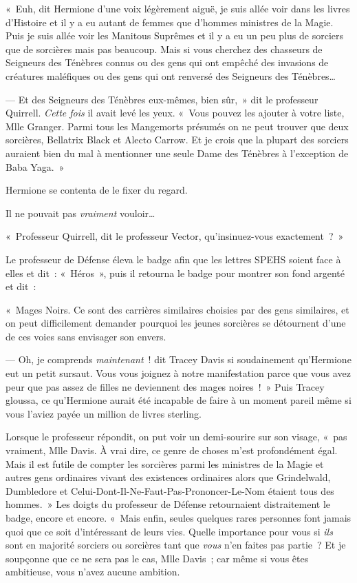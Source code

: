 «~Euh, dit Hermione d'une voix légèrement aiguë, je suis allée voir dans les livres d'Histoire et il y a eu autant de femmes que d'hommes ministres de la Magie.
Puis je suis allée voir les Manitous Suprêmes et il y a eu un peu plus de sorciers que de sorcières mais pas beaucoup.
Mais si vous cherchez des chasseurs de Seigneurs des Ténèbres connus ou des gens qui ont empêché des invasions de créatures maléfiques ou des gens qui ont renversé des Seigneurs des Ténèbres…

--- Et des Seigneurs des Ténèbres eux-mêmes, bien sûr,~» dit le professeur Quirrell.
\emph{Cette fois} il avait levé les yeux.
«~Vous pouvez les ajouter à votre liste, Mlle Granger.
Parmi tous les Mangemorts présumés on ne peut trouver que deux sorcières, Bellatrix Black et Alecto Carrow.
Et je crois que la plupart des sorciers auraient bien du mal à mentionner une seule Dame des Ténèbres à l'exception de Baba Yaga.~»

Hermione se contenta de le fixer du regard.

Il ne pouvait pas \emph{vraiment} vouloir…

«~Professeur Quirrell, dit le professeur Vector, qu'insinuez-vous exactement~?~»

Le professeur de Défense éleva le badge afin que les lettres SPEHS soient face à elles et dit~: «~Héros~», puis il retourna le badge pour montrer son fond argenté et dit~:

«~Mages Noirs.
Ce sont des carrières similaires choisies par des gens similaires, et on peut difficilement demander pourquoi les jeunes sorcières se détournent d'une de ces voies sans envisager son envers.

--- Oh, je comprends \emph{maintenant}~! dit Tracey Davis si soudainement qu'Hermione eut un petit sursaut.
Vous vous joignez à notre manifestation parce que vous avez peur que pas assez de filles ne deviennent des mages noires~!~»
Puis Tracey gloussa, ce qu'Hermione aurait été incapable de faire à un moment pareil même si vous l'aviez payée un million de livres sterling.

Lorsque le professeur répondit, on put voir un demi-sourire sur son visage, «~pas vraiment, Mlle Davis.
À vrai dire, ce genre de choses m'est profondément égal.
Mais il est futile de compter les sorcières parmi les ministres de la Magie et autres gens ordinaires vivant des existences ordinaires alors que Grindelwald, Dumbledore et Celui-Dont-Il-Ne-Faut-Pas-Prononcer-Le-Nom étaient tous des hommes.~»
Les doigts du professeur de Défense retournaient distraitement le badge, encore et encore.
«~Mais enfin, seules quelques rares personnes font jamais quoi que ce soit d'intéressant de leurs vies.
Quelle importance pour vous si \emph{ils} sont en majorité sorciers ou sorcières tant que \emph{vous} n'en faites pas partie~?
Et je soupçonne que ce ne sera pas le cas, Mlle Davis~; car même si vous êtes ambitieuse, vous n'avez aucune ambition.

